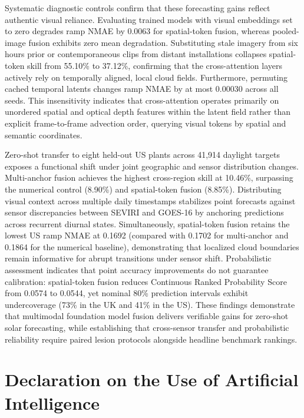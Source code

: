 Systematic diagnostic controls confirm that these forecasting gains reflect authentic visual reliance. Evaluating trained models with visual embeddings set to zero degrades ramp NMAE by 0.0063 for spatial-token fusion, whereas pooled-image fusion exhibits zero mean degradation. Substituting stale imagery from six hours prior or contemporaneous clips from distant installations collapses spatial-token skill from 55.10\% to 37.12\%, confirming that the cross-attention layers actively rely on temporally aligned, local cloud fields. Furthermore, permuting cached temporal latents changes ramp NMAE by at most 0.00030 across all seeds. This insensitivity indicates that cross-attention operates primarily on unordered spatial and optical depth features within the latent field rather than explicit frame-to-frame advection order, querying visual tokens by spatial and semantic coordinates.

Zero-shot transfer to eight held-out US plants across 41,914 daylight targets exposes a functional shift under joint geographic and sensor distribution changes. Multi-anchor fusion achieves the highest cross-region skill at 10.46\%, surpassing the numerical control (8.90\%) and spatial-token fusion (8.85\%). Distributing visual context across multiple daily timestamps stabilizes point forecasts against sensor discrepancies between SEVIRI and GOES-16 by anchoring predictions across recurrent diurnal states. Simultaneously, spatial-token fusion retains the lowest US ramp NMAE at 0.1692 (compared with 0.1702 for multi-anchor and 0.1864 for the numerical baseline), demonstrating that localized cloud boundaries remain informative for abrupt transitions under sensor shift. Probabilistic assessment indicates that point accuracy improvements do not guarantee calibration: spatial-token fusion reduces Continuous Ranked Probability Score from 0.0574 to 0.0544, yet nominal 80\% prediction intervals exhibit undercoverage (73\% in the UK and 41\% in the US). These findings demonstrate that multimodal foundation model fusion delivers verifiable gains for zero-shot solar forecasting, while establishing that cross-sensor transfer and probabilistic reliability require paired lesion protocols alongside headline benchmark rankings.

\clearpage
\section*{Declaration on the Use of Artificial Intelligence}
\label{sec:ai-declaration}


